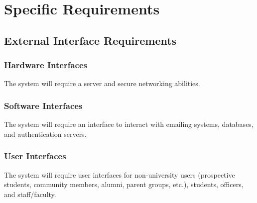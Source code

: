 \chapter{Specific Requirements}
	\section{External Interface Requirements}
		\subsection{Hardware Interfaces}
			The system will require a server and secure networking
			abilities.
		\subsection{Software Interfaces}
			The system will require an interface to interact with
			emailing systems, databases, and authentication servers.
		\subsection{User Interfaces}
			The system will require user interfaces for non-university
			users (prospective students, community members, alumni,
			parent groups, etc.), students, officers, and staff/faculty.
